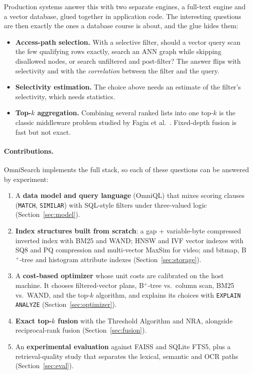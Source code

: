 \documentclass[11pt,a4paper]{article}
\newcommand{\code}[1]{\texttt{\small #1}}
\newcommand{\sect}[1]{Section~\ref{#1}}
\begin{document}
Production systems answer this with two separate engines, a full-text engine and a vector database, glued
together in application code. The interesting questions are then exactly the ones a database course is
about, and the glue hides them:
\begin{itemize}
  \item \textbf{Access-path selection.} With a selective filter, should a vector query scan the few
        qualifying rows exactly, search an ANN graph while skipping disallowed nodes, or search
        unfiltered and post-filter? The answer flips with selectivity and with the
        \emph{correlation} between the filter and the query.
  \item \textbf{Selectivity estimation.} The choice above needs an estimate of the filter's
        selectivity, which needs statistics.
  \item \textbf{Top-$k$ aggregation.} Combining several ranked lists into one top-$k$ is the classic
        middleware problem studied by Fagin et al.~\cite{fagin2001}. Fixed-depth fusion is fast but
        not exact.
\end{itemize}

\paragraph{Contributions.} OmniSearch implements the full stack, so each of these questions can be
answered by experiment:
\begin{enumerate}
  \item A \textbf{data model and query language} (OmniQL) that mixes scoring clauses (\code{MATCH},
        \code{SIMILAR}) with SQL-style filters under three-valued logic (\sect{sec:model}).
  \item \textbf{Index structures built from scratch}: a gap + variable-byte compressed inverted index
        with BM25 and WAND; HNSW and IVF vector indexes with SQ8 and PQ compression and multi-vector
        MaxSim for video; and bitmap, B$^+$-tree and histogram attribute indexes (\sect{sec:storage}).
  \item A \textbf{cost-based optimizer} whose unit costs are calibrated on the host machine. It
        chooses filtered-vector plans, B$^+$-tree vs.\ column scan, BM25 vs.\ WAND, and the top-$k$
        algorithm, and explains its choices with \code{EXPLAIN ANALYZE} (\sect{sec:optimizer}).
  \item \textbf{Exact top-$k$ fusion} with the Threshold Algorithm and NRA, alongside reciprocal-rank
        fusion (\sect{sec:fusion}).
  \item An \textbf{experimental evaluation} against FAISS and SQLite FTS5, plus a retrieval-quality
        study that separates the lexical, semantic and OCR paths (\sect{sec:eval}).
\end{enumerate}
\end{document}
